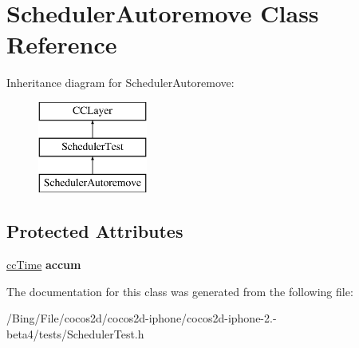 \hypertarget{interface_scheduler_autoremove}{\section{Scheduler\-Autoremove Class Reference}
\label{interface_scheduler_autoremove}
}
Inheritance diagram for Scheduler\-Autoremove\-:\begin{figure}[H]
\begin{center}
\leavevmode
\includegraphics[height=3.000000cm]{interface_scheduler_autoremove}
\end{center}
\end{figure}
\subsection*{Protected Attributes}
\begin{DoxyCompactItemize}
\item 
\hypertarget{interface_scheduler_autoremove_ab4e772f137ed0e3d3b2390507597dbb6}{\hyperlink{cc_types_8h_ae6c674aac4bfb46a4e6cb1e89bb66b4f}{cc\-Time} {\bfseries accum}}\label{interface_scheduler_autoremove_ab4e772f137ed0e3d3b2390507597dbb6}

\end{DoxyCompactItemize}


The documentation for this class was generated from the following file\-:\begin{DoxyCompactItemize}
\item 
/\-Bing/\-File/cocos2d/cocos2d-\/iphone/cocos2d-\/iphone-\/2.-\/beta4/tests/Scheduler\-Test.\-h\end{DoxyCompactItemize}
